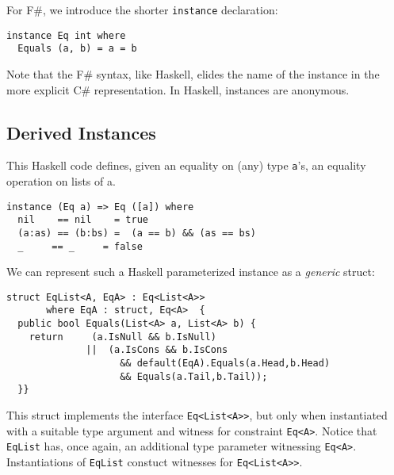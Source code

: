 \documentclass[preprint]{sig-alternate-05-2015}
\begin{document}
For F\#, we introduce the shorter \lstinline{instance} declaration:

\begin{lstlisting}
instance Eq int where 
  Equals (a, b) = a = b
\end{lstlisting}

Note that the F\# syntax, like Haskell, elides the name of the instance in the more explicit C\# representation.
In Haskell, instances are anonymous.


\subsection{Derived Instances}

This Haskell code defines, given an equality on (any) type \lstinline{a}'s, an equality operation on lists of a.
\begin{lstlisting}
instance (Eq a) => Eq ([a]) where 
  nil    == nil    = true
  (a:as) == (b:bs) =  (a == b) && (as == bs)
  _     == _     = false
\end{lstlisting}


We can represent such a Haskell parameterized instance as a \emph{generic} struct:


\begin{lstlisting}
struct EqList<A, EqA> : Eq<List<A>>
       where EqA : struct, Eq<A>  {
  public bool Equals(List<A> a, List<A> b) {
    return     (a.IsNull && b.IsNull)
              ||  (a.IsCons && b.IsCons 
                    && default(EqA).Equals(a.Head,b.Head) 
                    && Equals(a.Tail,b.Tail));
  }}
\end{lstlisting}

This struct implements the interface \lstinline{Eq<List<A>>}, but only when instantiated with a suitable type argument and witness for constraint \lstinline{Eq<A>}.
Notice that \lstinline{EqList} has, once again, an additional type parameter witnessing \lstinline{Eq<A>}.
Instantiations of \lstinline{EqList} constuct witnesses for \lstinline{Eq<List<A>>}.
\end{document}
